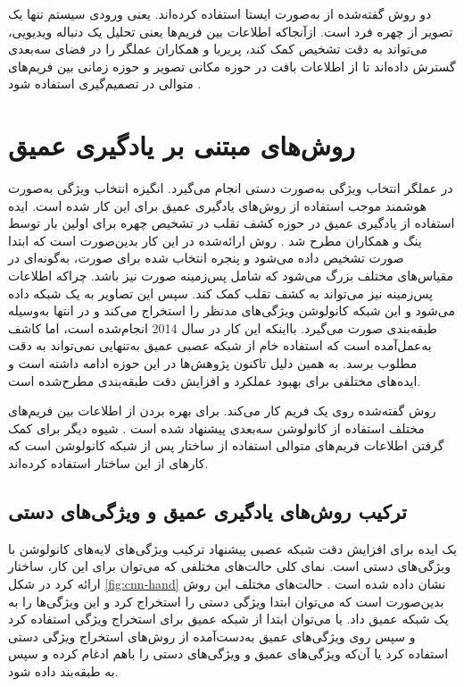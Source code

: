 دو روش گفته‌شده از  به‌صورت ایستا استفاده کرده‌اند. یعنی ورودی سیستم تنها یک تصویر از چهره فرد است. از‌آنجا‌که اطلاعات بین فریم‌ها یعنی تحلیل یک دنباله ویدیویی، می‌تواند به دقت تشخیص کمک کند، پریریا و همکاران عملگر  را در فضای سه‌بعدی گسترش داده‌اند تا از اطلاعات بافت در حوزه مکانی تصویر و حوزه زمانی بین فریم‌های متوالی در تصمیم‌گیری استفاده شود
\cite{freitas2012lbp}.
\section{روش‌های مبتنی بر یادگیری عمیق}
 در عملگر  انتخاب ویژگی به‌صورت دستی انجام می‌گیرد. انگیزه انتخاب ویژگی به‌صورت هوشمند موجب استفاده از روش‌های یادگیری عمیق برای این کار شده است. ایده استفاده از یادگیری عمیق در حوزه کشف تقلب در تشخیص چهره برای اولین بار توسط ینگ و همکاران مطرح شد 
\cite{yang2014learn}.
 روش ارائه‌شده در این کار بدین‌صورت است که ابتدا صورت تشخیص داده می‌شود و پنجره انتخاب شده برای صورت، به‌گونه‌ای در مقیاس‌های مختلف بزرگ می‌شود که شامل پس‌زمینه صورت نیز باشد. چرا‌که اطلاعات پس‌زمینه نیز می‌تواند به کشف تقلب کمک کند. سپس این تصاویر به یک شبکه 
\cite{krizhevsky2012imagenet}
  داده می‌شود و این شبکه کانولوشن ویژگی‌های مد‌نظر را استخراج می‌کند و در انتها به‌وسیله  طبقه‌بندی صورت می‌گیرد. با‌اینکه این کار در سال 2014 انجام‌شده است، اما کاشف به‌عمل‌آمده است که استفاده خام از شبکه عصبی عمیق به‌تنهایی نمی‌تواند به دقت مطلوب برسد. به همین دلیل تاکنون پژوهش‌ها در این حوزه ادامه داشته است و ایده‌های مختلفی برای بهبود عملکرد و افزایش دقت طبقه‌بندی مطرح‌شده است. 
 
 روش گفته‌شده روی یک فریم کار می‌کند. برای بهره بردن از اطلاعات بین فریم‌های مختلف استفاده از کانولوشن سه‌بعدی پیشنهاد‌ شده است 
\cite{gan20173d,li2018learning}
 . شیوه دیگر برای کمک گرفتن اطلاعات فریم‌های متوالی استفاده از ساختار
 \cite{hochreiter1997long}
  پس از شبکه کانولوشن است که کارهای
\cite{xu2015learning,yang2019face}
از این ساختار استفاده کرده‌اند.
 

\subsection{ترکیب روش‌های یادگیری عمیق و ویژگی‌های دستی}
یک ایده برای افزایش دقت شبکه عصبی پیشنهاد ترکیب ویژگی‌های لایه‌های کانولوشن با ویژگی‌های دستی
 است. نمای کلی حالت‌های مختلفی که می‌توان برای این کار، ساختار ارائه کرد در شکل 
\ref{fig:cnn-hand}
نشان داده شده است 
\cite{yu2021deep}.
 حالت‌های مختلف این روش بدین‌صورت است که می‌توان ابتدا ویژگی دستی را استخراج کرد و این ویژگی‌ها را به یک شبکه عمیق داد. یا می‌توان ابتدا از شبکه عمیق برای استخراج ویژگی استفاده کرد و سپس روی ویژگی‌های عمیق به‌دست‌آمده از روش‌های استخراج ویژگی دستی استفاده کرد یا آن‌که ویژگی‌های عمیق و ویژگی‌های دستی را با‌هم ادغام کرده و سپس به طبقه‌بند داده شود.

